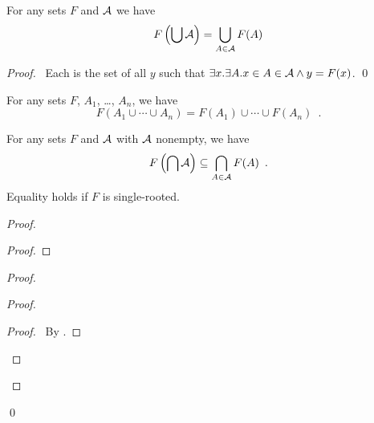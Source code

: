 \begin{theorem}
    For any sets $F$ and $\AA$ we have
    \[ F \left( \bigcup \AA \right) = \bigcup_{A \in \AA} F(A) \]
\end{theorem}

\begin{proof}
    \pf\ Each is the set of all $y$ such that $\exists x. \exists A.
    x \in A \in \AA \wedge y = F(x)$. \qed
\end{proof}

\begin{corollary}
    For any sets $F$, $A_1$, \ldots, $A_n$, we have
    \[ F(A_1 \cup \cdots \cup A_n) = F(A_1) \cup \cdots \cup F(A_n) \enspace . \]
\end{corollary}

\begin{theorem}
    For any sets $F$ and $\AA$ with $\AA$ nonempty, we have
    \[ F \left( \bigcap \AA \right) \subseteq \bigcap_{A \in \AA} F(A) \enspace . \]
    Equality holds if $F$ is single-rooted.
\end{theorem}

\begin{proof}
    \pf
    \begin{proof}
    \end{proof}
    \begin{proof}
        \begin{proof}
            \begin{proof}
                \pf\ By .
            \end{proof}
        \end{proof}
    \end{proof}
    \qed
\end{proof}

